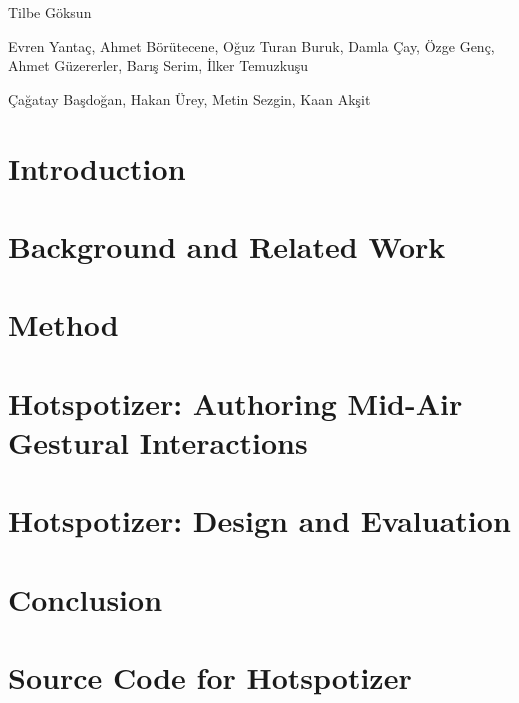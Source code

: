 \documentclass[10pt,twoside]{book}
\begin{document}
Tilbe Göksun

Evren Yantaç, Ahmet Börütecene, Oğuz Turan Buruk, Damla Çay, Özge Genç, Ahmet Güzererler, Barış Serim, İlker Temuzkuşu

Çağatay Başdoğan, Hakan Ürey, Metin Sezgin, Kaan Akşit

\tableofcontents

\pagestyle{fancy}

\chapter{Introduction}


\chapter{Background and Related Work}


\chapter{Method}


\chapter{Hotspotizer: Authoring Mid-Air Gestural Interactions}


\chapter{Hotspotizer: Design and Evaluation}


\chapter{Conclusion}


\appendix
\chapter{Source Code for Hotspotizer}

\end{document}
